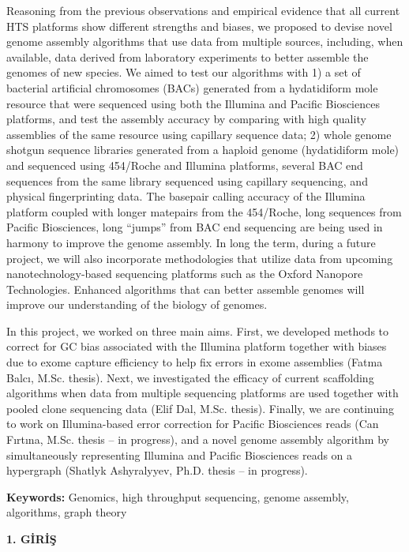 \documentclass[11pt]{article}
\begin{document}
Reasoning from the previous observations and empirical evidence that all current HTS platforms show different strengths and biases, we proposed to devise novel genome assembly algorithms that use data from multiple sources, including, when available, data derived from laboratory experiments to better assemble the genomes of new species. We aimed to test our algorithms with 1) a set of bacterial artificial chromosomes (BACs) generated from a hydatidiform mole resource that were sequenced using both the Illumina and Pacific Biosciences platforms, and test the assembly accuracy by comparing with high quality assemblies of the same resource using capillary sequence data; 2) whole genome shotgun sequence libraries generated from a haploid genome (hydatidiform mole) and sequenced using 454/Roche and Illumina platforms, several BAC end sequences from the same library sequenced using capillary sequencing, and physical fingerprinting data. The basepair calling accuracy of the Illumina platform coupled with longer matepairs from the 454/Roche, long sequences from Pacific Biosciences, long ``jumps'' from BAC end sequencing are being used in harmony to improve the genome assembly. In long the term, during a future project, we will also incorporate methodologies that utilize data from upcoming nanotechnology-based sequencing platforms such as the Oxford Nanopore Technologies. Enhanced algorithms that can better assemble genomes will improve our understanding of the biology of genomes.

In this project, we worked on three main aims. First, we developed methods to correct for GC bias associated with the Illumina platform together with biases due to exome capture efficiency to help fix errors in exome assemblies (Fatma Balcı, M.Sc. thesis). Next, we investigated the efficacy  of current scaffolding algorithms when data from multiple sequencing platforms are used together with pooled clone sequencing data (Elif Dal, M.Sc. thesis). Finally, we are continuing to work on Illumina-based error correction for Pacific Biosciences reads (Can Fırtına, M.Sc. thesis -- in progress), and a novel genome assembly algorithm by simultaneously representing Illumina and Pacific Biosciences reads on a hypergraph (Shatlyk Ashyralyyev, Ph.D. thesis -- in progress).

{\bf Keywords:} Genomics, high throughput sequencing, genome assembly, algorithms, graph theory


\newpage
\begin{center}
{\bf \Large 1. GİRİŞ}
\end{center}
\end{document}
